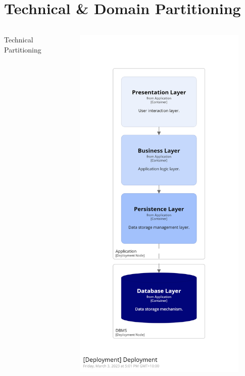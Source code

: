 \documentclass{slide}
\begin{document}
\section{Technical \& Domain Partitioning}

\begin{frame}
    \vspace{4mm}
    \begin{columns}[t]
        \centering
        \LARGE Technical Partitioning
        \begin{figure}
            \centering
            \includegraphics[trim=197 197 197 195,clip,width=0.29\textheight]{../../notes/microkernel/diagrams/technical-partitioning.png}

\end{figure}
\end{columns}
\end{frame}
\end{document}
